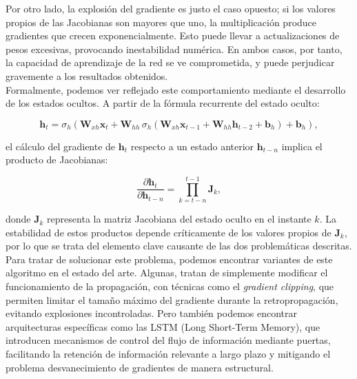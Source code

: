 Por otro lado, la explosión del gradiente es justo el caso opuesto; si los valores propios de las Jacobianas son mayores que uno, la multiplicación produce gradientes que crecen exponencialmente. Esto puede llevar a actualizaciones de pesos excesivas, provocando inestabilidad numérica. En ambos casos, por tanto, la capacidad de aprendizaje de la red se ve comprometida, y puede perjudicar gravemente a los resultados obtenidos.\\

Formalmente, podemos ver reflejado este comportamiento mediante el desarrollo de los estados ocultos. A partir de la fórmula recurrente del estado oculto:

\begin{equation}
	\mathbf{h}_t = \sigma_h\left( \mathbf{W}_{xh} \mathbf{x}_t + \mathbf{W}_{hh} \, \sigma_h\left( \mathbf{W}_{xh} \mathbf{x}_{t-1} + \mathbf{W}_{hh} \mathbf{h}_{t-2} + \mathbf{b}_h \right) + \mathbf{b}_h \right),
	\label{eq:hidden_state_expansion}
\end{equation}

el cálculo del gradiente de \(\mathbf{h}_t\) respecto a un estado anterior \(\mathbf{h}_{t-n}\) implica el producto de Jacobianas:

\begin{equation}
	\frac{\partial \mathbf{h}_t}{\partial \mathbf{h}_{t-n}} = \prod_{k=t-n}^{t-1} \mathbf{J}_k,
	\label{eq:jacobian_product}
\end{equation}

donde \(\mathbf{J}_k\) representa la matriz Jacobiana del estado oculto en el instante \(k\). La estabilidad de estos productos depende críticamente de los valores propios de \(\mathbf{J}_k\), por lo que se trata del elemento clave causante de las dos problemáticas descritas.\\

Para tratar de solucionar este problema, podemos encontrar variantes de este algoritmo en el estado del arte. Algunas, tratan de simplemente modificar el funcionamiento de la propagación, con técnicas como el \textit{gradient clipping}, que permiten limitar el tamaño máximo del gradiente durante la retropropagación, evitando explosiones incontroladas. Pero también podemos encontrar arquitecturas específicas como las LSTM (Long Short-Term Memory), que introducen mecanismos de control del flujo de información mediante puertas, facilitando la retención de información relevante a largo plazo y mitigando el problema desvanecimiento de gradientes de manera estructural.

